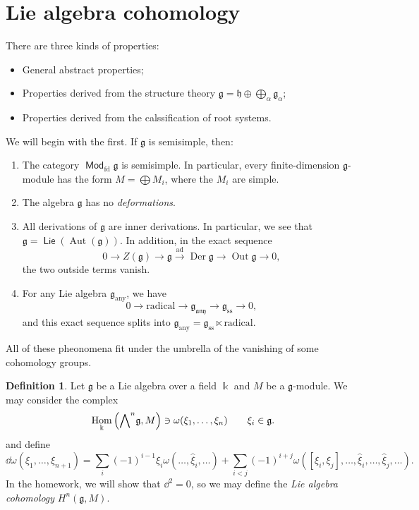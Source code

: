 \documentclass[leqno, openany]{memoir}
\theoremstyle{definition}
\newtheorem{defn}[thm]{Definition}
\theoremstyle{remark}
\theoremstyle{plain}
\theoremstyle{definition}
\theoremstyle{remark}
\renewcommand{\k}{\Bbbk}
\newcommand{\mf}[1]{\mathfrak{#1}}
\newcommand{\mr}[1]{\mathrm{#1}}
\newcommand{\wh}[1]{\widehat{#1}}
\DeclareMathOperator{\Hom}{Hom}
\DeclareMathOperator{\ad}{ad}
\DeclareMathOperator{\Aut}{Aut}
\DeclareMathOperator{\Lie}{\mathsf{Lie}}
\DeclareMathOperator{\Mod}{\mathsf{Mod}}
\begin{document}
\section{Lie algebra cohomology}%

There are three kinds of properties: \begin{itemize} \item General abstract
    properties; \item Properties derived from the structure theory $\mf{g} =
    \mf{h} \oplus \bigoplus_{\alpha} \mf{g}_{\alpha}$; \item Properties derived
    from the calssification of root systems.  \end{itemize}

We will begin with the first. If $\mf{g}$ is semisimple, then:
\begin{enumerate} \item The category $\Mod_{\mr{fd}} \mf{g}$ is semisimple. In
    particular, every finite-dimension $\mf{g}$-module has the form $M =
    \bigoplus M_i$, where the $M_i$ are simple.  \item The algebra $\mf{g}$ has
    no \textit{deformations}.  \item All derivations of $\mf{g}$ are inner
    derivations. In particular, we see that $\mf{g} = \Lie(\Aut(\mf{g}))$. In
    addition, in the exact sequence \[ 0 \to Z(\mf{g}) \to \mf{g}
        \xrightarrow{\ad} \operatorname{Der} \mf{g} \to \operatorname{Out}
        \mf{g} \to 0, \] the two outside terms vanish.  \item For any Lie
        algebra $\mf{g}_{\mr{any}}$, we have \[ 0 \to \text{radical} \to
        \mf{g}_{\mf{any}} \to \mf{g}_{\mr{ss}} \to 0, \] and this exact
sequence splits into $\mf{g}_{\mr{any}} = \mf{g}_{\mr{ss}} \ltimes
\text{radical}$.  \end{enumerate} All of these pheonomena fit under the
umbrella of the vanishing of some cohomology groups.

\begin{defn} Let $\mf{g}$ be a Lie algebra over a field $\k$ and $M$ be a
    $\mf{g}$-module. We may consider the complex \[ \Hom_{\k}
        \qty({\bigwedge}^n \mf{g}, M) \ni \omega(\xi_1, \ldots, \xi_n) \qquad
        \xi_i \in \mf{g}. \] and define \[ \dd{\omega}(\xi_1, \ldots,
    \xi_{n+1}) = \sum_i {(-1)}^{i-1} \xi_i \omega (\ldots, \wh{\xi}_i, \ldots)
+ \sum_{i < j} {(-1)}^{i+j} \omega ([\xi_i, \xi_j], \ldots, \wh{\xi}_i, \ldots,
\wh{\xi}_j, \ldots). \] In the homework, we will show that $\dd^2 = 0$, so we
may define the \textit{Lie algebra cohomology} $H^n(\mf{g}, M)$.  \end{defn}
\end{document}
